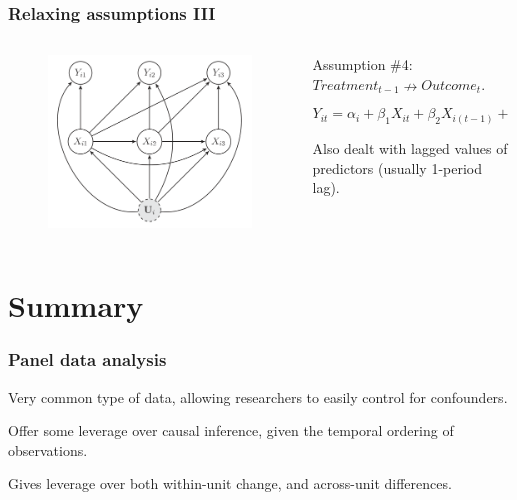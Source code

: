 \documentclass[11pt,english,dvipsnames,aspectratio=169,handout]{beamer}\usepackage[]{graphicx}\usepackage[]{xcolor}
\begin{document}
\begin{frame}
	\frametitle{Relaxing assumptions III}
	
	\begin{columns}
		\begin{column}{0.6\textwidth}
			\begin{figure}
				\centering
				\includegraphics[scale=0.4]{../04-figures/09/04.PNG}
			\end{figure}
		\end{column}
		\begin{column}{0.4\textwidth}
			\footnotesize
			Assumption \#4: $Treatment_{t-1} \nrightarrow Outcome_t$.\pause
			
			\begin{equation}
				Y_{it} = \alpha_i + \beta_1X_{it} + \beta_2X_{i(t-1)} + \epsilon_{it}\nonumber
			\end{equation}\pause
			
			Also dealt with lagged values of predictors (usually 1-period lag).
		\end{column}
	\end{columns}
	
\end{frame}


\section{Summary}

\begin{frame}
  \frametitle{Panel data analysis}
  Very common type of data, allowing researchers to easily control for confounders.\bigskip
  \pause
  
  Offer some leverage over causal inference, given the temporal ordering of observations.\bigskip
  \pause
  
  Gives leverage over both within-unit change, and across-unit differences.

\end{frame}
\end{document}
